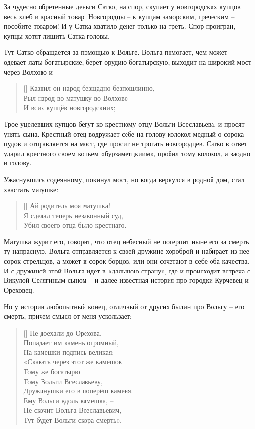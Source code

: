 За чудесно обретенные деньги Сатко, на спор, скупает у новгородских купцов весь хлеб и красный товар. Новгородцы – к купцам заморским, греческим – пособите товаром! И у Сатка хватило денег только на треть. Спор проигран, купцы хотят лишить Сатка головы.

Тут Сатко обращается за помощью к Вольге. Вольга помогает, чем может – одевает латы богатырские, берет орудию богатырскую, выходит на широкий мост через Волхово и

\settowidth{\versewidth}{Казнил он народ безщадно безпошлинно,} 
\begin{verse}[\versewidth]
Казнил он народ безщадно безпошлинно,\\
Рыл народ во матушку во Волхово\\
И всих купцёв новгородскиих;
\end{verse}

Трое уцелевших купцов бегут ко крестному отцу Вольги Всеславьева, и просят унять сына. Крестный отец водружает себе на голову колокол медный о сорока пудов и отправляется на мост, где просит не трогать новгородцев. Сатко в ответ ударил крестного своем копьем «бурзаметцкиим», пробил тому колокол, а заодно и голову.

Ужаснувшись содеянному, покинул мост, но когда вернулся в родной дом, стал хвастать матушке:

\settowidth{\versewidth}{Я сделал теперь незаконный суд,} 
\begin{verse}[\versewidth]
Ай родитель моя матушка!\\
Я сделал теперь незаконный суд,\\
Убил своего отца было крестнаго.
\end{verse}

Матушка журит его, говорит, что отец небесный не потерпит ныне его за смерть ту напрасную. Вольга отправляется к своей дружине хороброй и набирает из нее сорок стрельцов, а может и сорок борцов, или они сочетают в себе оба качества. И с дружиной этой Вольга идет в «дальнюю страну», где и происходит встреча с Викулой Селягиным сыном – и далее известная история про городки Курчевец и Ореховец.

Но у истории любопытный конец, отличный от других былин про Вольгу – его смерть, причем смысл от меня ускользает:

\settowidth{\versewidth}{Дружинушки его в поперёш каменя.} 
\begin{verse}[\versewidth]
Не доехали до Орехова,\\
Попадает им камень огромный,\\
На камешки подпись великая:\\
«Скакать через этот же камешок\\
Тому же богатырю\\
Тому Вольги Всеславьеву,\\
Дружинушки его в поперёш каменя.\\
Ему Вольги вдоль камешка, – \\
Не скочит Вольга Всеславьевич,\\
Тут будет Вольги скора смерть».
\end{verse}

